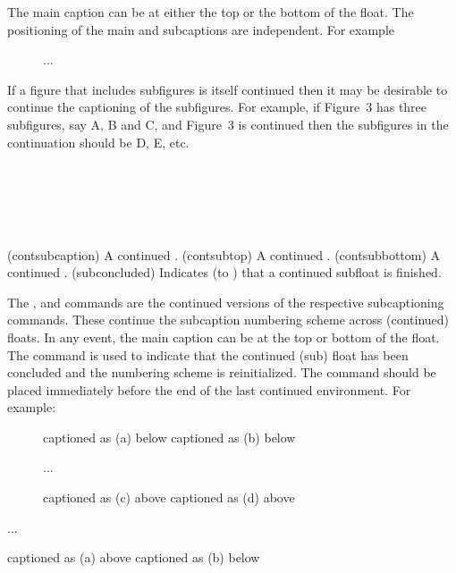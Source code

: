     The main caption can be at either the top or the bottom of the float.
The positioning of the main and subcaptions are independent.
For example
\begin{lcode}
\begin{figure}
  \caption{...}
\end{figure}
\end{lcode}


    If a figure that includes subfigures
is itself continued then it may be desirable to
continue the captioning of the subfigures. For example, if Figure~3
has three subfigures, say A, B and C, and Figure~3 is continued then
the subfigures in the continuation should be D, E, etc.
\begin{syntax}
\cmd{\contsubcaption} \\
\cmd{\contsubtop} \\
\cmd{\contsubbottom} \\
\cmd{\subconcluded} \\
\end{syntax}
\glossary(contsubcaption)%
  {}%
  { A continued .}
\glossary(contsubtop)%
  {}%
  { A continued .}
\glossary(contsubbottom)%
  {}%
  { A continued .}
\glossary(subconcluded)%
  {}
  {Indicates (to \ltx) that a continued subfloat is finished.}

The \cmd{\contsubcaption}, \cmd{\contsuptop} and \cmd{\contsubbottom}
commands are the continued 
versions of the respective subcaptioning
commands. These continue the subcaption numbering scheme across
(continued) floats. In any event, the main caption can 
 be at the top or bottom of the float.
 The \cmd{\subconcluded} command is used to indicate that the continued 
 (sub) float has been concluded and the numbering
 scheme is reinitialized. The command should be placed immediately
 before the end of the last continued environment.
    For example:
 \begin{lcode}
 \begin{figure}
   captioned as (a) below
   captioned as (b) below
 \caption{...}
 \end{figure}
 \begin{figure}
   captioned as (c) above
   captioned as (d) above
 \subconcluded
 \end{figure}
 ...
 \begin{table}
 \caption{...}
      captioned as (a) above
   captioned as (b) below
 \end{table}
 \end{lcode}


